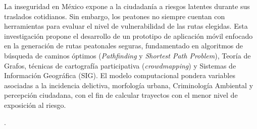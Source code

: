 
La inseguridad en México expone a la ciudadanía a riesgos latentes durante sus traslados cotidianos. Sin embargo, los peatones no siempre cuentan con herramientas para evaluar el nivel de vulnerabilidad de las rutas elegidas. Esta investigación propone el desarrollo de un prototipo de aplicación móvil enfocado en la generación de rutas peatonales seguras, fundamentado en algoritmos de búsqueda de caminos óptimos (\textit{Pathfinding} y \textit{Shortest Path Problem}), Teoría de Grafos, técnicas de cartografía participativa (\textit{crowdmapping}) y Sistemas de Información Geográfica (SIG). El modelo computacional pondera variables asociadas a la incidencia delictiva, morfología urbana, Criminología Ambiental y percepción ciudadana, con el fin de calcular trayectos con el menor nivel de exposición al riesgo.

.
